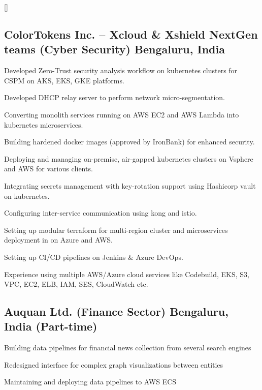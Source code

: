\documentclass[letter,10pt]{article}
\begin{document}
\titlespacing*{\subsubsection}{0em}{0em}{0em}
\titleformat{\subsubsection}{\itshape}{}{0em}{}[]


\subsection{ColorTokens Inc. -- Xcloud \& Xshield NextGen teams (Cyber Security) \hfill Bengaluru, India}
\begin{zitemize}
    \item Developed Zero-Trust security analysis workflow on kubernetes clusters for CSPM
    on AKS, EKS, GKE platforms.
    \item Developed DHCP relay server to perform network micro-segmentation.
    \item Converting monolith services running on AWS EC2 and AWS Lambda into kubernetes
    microservices.
    \item Building hardened docker images (approved by IronBank) for enhanced security.
    \item Deploying and managing on-premise, air-gapped kubernetes clusters on Vsphere
    and AWS for various clients.
    \item Integrating secrets management with key-rotation support using Hashicorp vault
    on kubernetes.
    \item Configuring inter-service communication using kong and istio.
    \item Setting up modular terraform for multi-region cluster and microservices
    deployment in on Azure and AWS.
    \item Setting up CI/CD pipelines on Jenkins \& Azure DevOps.
    \item Experience using multiple AWS/Azure cloud services like Codebuild, EKS, S3,
    VPC, EC2, ELB, IAM, SES, CloudWatch etc.
\end{zitemize}


\subsection{Auquan Ltd. (Finance Sector) \hfill Bengaluru, India (Part-time)}
\begin{zitemize}
    \item Building data pipelines for financial news collection from several search
    engines
    \item Redesigned interface for complex graph visualizations between entities
    \item Maintaining and deploying data pipelines to AWS ECS
\end{zitemize}
\end{document}
